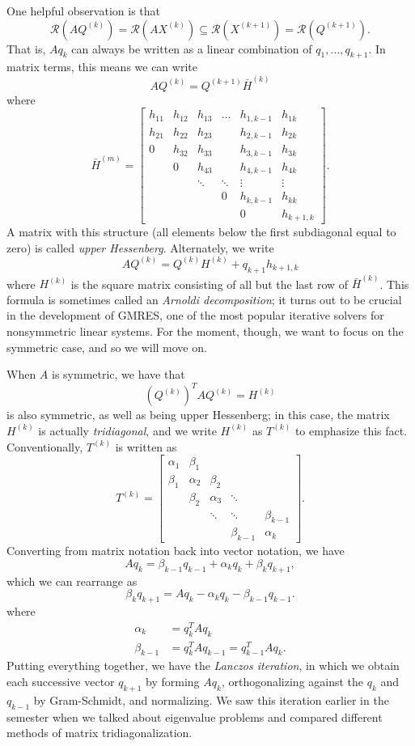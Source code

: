 \documentclass[12pt, leqno]{article}
\newcommand{\calR}{\mathcal{R}}
\begin{document}
One helpful observation is that
\[
  \calR(AQ^{(k)}) = \calR(AX^{(k)}) \subseteq
  \calR(X^{(k+1)}) = \calR(Q^{(k+1)}).
  \]
That is, $Aq_k$ can always be written as a linear combination
of $q_1, \ldots, q_{k+1}$.  In matrix terms, this means we can write
\[
  AQ^{(k)} = Q^{(k+1)} \bar{H}^{(k)}
\]
where
\[
\bar{H}^{(m)} =
\begin{bmatrix}
  h_{11} & h_{12} & h_{13} & \ldots & h_{1,k-1} & h_{1k} \\
  h_{21} & h_{22} & h_{23} &        & h_{2,k-1} & h_{2k} \\
  0     & h_{32} & h_{33} &        & h_{3,k-1} & h_{3k} \\
        & 0      & h_{43} &       & h_{4,k-1} & h_{4k} \\
        &        & \ddots & \ddots & \vdots & \vdots \\
        &        &        & 0      &  h_{k,k-1} & h_{kk} \\
        &        &        &        &  0        & h_{k+1,k}
\end{bmatrix}.
\]
A matrix with this structure (all elements below the first subdiagonal
equal to zero) is called {\em upper Hessenberg}.  Alternately,
we write
\[
  AQ^{(k)} = Q^{(k)} H^{(k)} + q_{k+1} h_{k+1,k}
\]
where $H^{(k)}$ is the square matrix consisting of all but the last
row of $\bar{H}^{(k)}$.  This formula is sometimes called an
{\em Arnoldi decomposition}; it turns out to be crucial in the
development of GMRES, one of the most popular iterative solvers for
nonsymmetric linear systems.  For the moment, though, we want to
focus on the symmetric case, and so we will move on.

When $A$ is symmetric, we have that
\[
  (Q^{(k)})^T A Q^{(k)} = H^{(k)}
\]
is also symmetric, as well as being upper Hessenberg; in this case,
the matrix $H^{(k)}$ is actually {\em tridiagonal}, and we write
$H^{(k)}$ as $T^{(k)}$ to emphasize this fact.  Conventionally,
$T^{(k)}$ is written as
\[
T^{(k)} =
\begin{bmatrix}
  \alpha_1 & \beta_1 \\
  \beta_1 & \alpha_2 & \beta_2 \\
          & \beta_2 & \alpha_3 & \ddots \\
          &         & \ddots & \ddots & \beta_{k-1} \\
          &         &        & \beta_{k-1} & \alpha_k
\end{bmatrix}.
\]
Converting from matrix notation back into vector notation, we have
\[
  A q_{k} = \beta_{k-1} q_{k-1} + \alpha_k q_k + \beta_k q_{k+1},
\]
which we can rearrange as
\[
  \beta_k q_{k+1} = A q_k - \alpha_k q_k - \beta_{k-1} q_{k-1}.
\]
where
\begin{align*}
  \alpha_k &= q_k^T A q_k \\
  \beta_{k-1} &= q_k^T A q_{k-1} = q_{k-1}^T A q_k.
\end{align*}
Putting everything together, we have the {\em Lanczos iteration},
in which we obtain each successive vector $q_{k+1}$ by forming $Aq_k$,
orthogonalizing against the $q_k$ and $q_{k-1}$ by Gram-Schmidt,
and normalizing.  We saw this iteration earlier in the semester
when we talked about eigenvalue problems and compared different
methods of matrix tridiagonalization.
\end{document}
